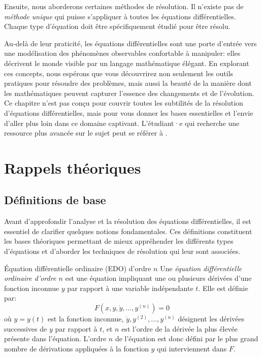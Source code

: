         Ensuite, nous aborderons certaines méthodes de résolution. Il n’existe pas de \textit{méthode unique} qui puisse s'appliquer à toutes les équations différentielles. Chaque type d'équation doit être spécifiquement étudié pour être résolu.
        
        Au-delà de leur praticité, les équations différentielles sont une porte d'entrée vers une modélisation des phénomènes observables confortable à manipuler: elles décrivent le monde visible par un langage mathématique élégant. En explorant ces concepts, nous espérons que vous découvrirez non seulement les outils pratiques pour résoudre des problèmes, mais aussi la beauté de la manière dont les mathématiques peuvent capturer l’essence des changements et de l’évolution. Ce chapitre n'est pas conçu pour couvrir toutes les subtilités de la résolution d'équations différentielles, mais pour vous donner les bases essentielles et l'envie d'aller plus loin dans ce domaine captivant. L'étudiant·e qui recherche une ressource plus avancée sur le sujet peut se référer à \cite{Bangerezako2006}.

    \section{Rappels théoriques}
        \subsection{Définitions de base}
        Avant d'approfondir l'analyse et la résolution des équations différentielles, il est essentiel de clarifier quelques notions fondamentales. Ces définitions constituent les bases théoriques permettant de mieux appréhender les différents types d'équations et d'aborder les techniques de résolution qui leur sont associées. 
        
        \begin{definition}{Équation différentielle ordinaire (EDO) d'ordre $n$}\label{def:eqdiff}
            Une \textit{équation différentielle ordinaire d'ordre $n$} est une équation impliquant une ou plusieurs dérivées d'une fonction inconnue $y$ par rapport à une variable indépendante $t$. Elle est définie par:
            \begin{equation}
                F(x, y, \dot{y}, \ldots, y^{(n)})=0
            \end{equation}
            où $y=y(t)$ est la fonction inconnue, $\dot{y}, y^{(2)}, \ldots, y^{(n)}$ désignent les dérivées successives de $y$ par rapport à $t$, et $n$ est l'ordre de la dérivée la plus élevée présente dans l'équation. L'ordre $n$ de l'équation est donc défini par le plus grand nombre de dérivations appliquées à la fonction $y$ qui interviennent dans $F$.
        \end{definition}
        
